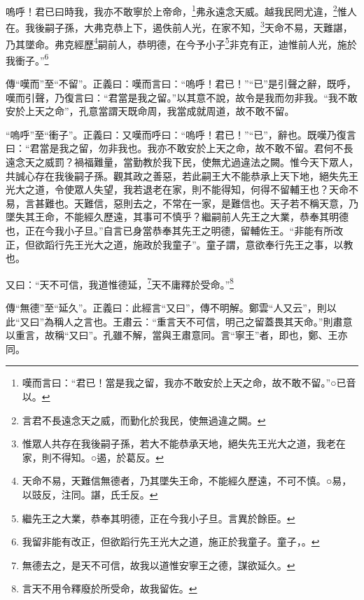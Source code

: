 嗚呼！君已曰時我，我亦不敢寧於上帝命，\footnote{嘆而言曰：“君已！當是我之留，我亦不敢安於上天之命，故不敢不留。”○已音以。}弗永遠念天威。越我民罔尤違，\footnote{言君不長遠念天之威，而勤化於我民，使無過違之闕。}惟人在。我後嗣子孫，大弗克恭上下，遏佚前人光，在家不知，\footnote{惟眾人共存在我後嗣子孫，若大不能恭承天地，絕失先王光大之道，我老在家，則不得知。○遏，於葛反。}天命不易，天難諶，乃其墜命。弗克經歷\footnote{天命不易，天難信無德者，乃其墜失王命，不能經久歷遠，不可不慎。○易，以豉反，注同。諶，氏壬反。}嗣前人，恭明德，在今予小子\footnote{繼先王之大業，恭奉其明德，正在今我小子旦。言異於餘臣。}非克有正，迪惟前人光，施於我衝子。”\footnote{我留非能有改正，但欲蹈行先王光大之道，施正於我童子。童子，。}


{\noindent\zhuan{}\fzbyks 傳“嘆而”至“不留”。正義曰：嘆而言曰：“嗚呼！君已！”“已”是引聲之辭，既呼，嘆而引聲，乃復言曰：“君當是我之留。”以其意不說，故令是我而勿非我。“我不敢安於上天之命”，孔意當謂天既命周，我當成就周道，故不敢不留。 \par}

{\noindent\shu{}\fzkt “嗚呼”至“衝子”。正義曰：又嘆而呼曰：“嗚呼！君已！”“已”，辭也。既嘆乃復言曰：“君當是我之留，勿非我也。我亦不敢安於上天之命，故不敢不留。君何不長遠念天之威罰？禍福難量，當勤教於我下民，使無尤過違法之闕。惟今天下眾人，共誠心存在我後嗣子孫。觀其政之善惡，若此嗣王大不能恭承上天下地，絕失先王光大之道，令使眾人失望，我若退老在家，則不能得知，何得不留輔王也？天命不易，言甚難也。天難信，惡則去之，不常在一家，是難信也。天子若不稱天意，乃墜失其王命，不能經久歷遠，其事可不慎乎？繼嗣前人先王之大業，恭奉其明德也，正在今我小子旦。”自言已身當恭奉其先王之明德，留輔佐王。“非能有所改正，但欲蹈行先王光大之道，施政於我童子”。童子謂，意欲奉行先王之事，以教也。 \par}

又曰：“天不可信，我道惟德延，\footnote{無德去之，是天不可信，故我以道惟安寧王之德，謀欲延久。}天不庸釋於受命。”\footnote{言天不用令釋廢於所受命，故我留佐。}


{\noindent\zhuan{}\fzbyks 傳“無德”至“延久”。正義曰：此經言“又曰”，傳不明解。鄭雲“人又云”，則以此“又曰”為稱人之言也。王肅云：“重言天不可信，明己之留蓋畏其天命。”則肅意以重言，故稱“又曰”。孔雖不解，當與王肅意同。言“寧王”者，即也，鄭、王亦同。 \par}

